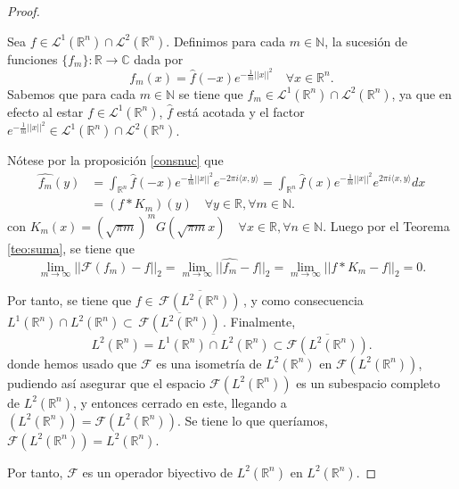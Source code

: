 \begin{proof}
\begin{itemize}
    Sea $f \in \mathscr{L}^1(\mathbb{R}^n) \cap \mathscr{L}^2(\mathbb{R}^n)$. Definimos para cada $m \in \mathbb{N}$, la sucesión de funciones $\{f_m\} : \mathbb{R} \rightarrow \mathbb{C}$ dada por
    \begin{equation}
        f_m(x) = \widehat{f}(-x)e^{-\frac{1}{m}||x||^2} \quad \forall x \in \mathbb{R}^n.
    \end{equation}
    Sabemos que para cada $m \in \mathbb{N}$ se tiene que $f_m \in \mathscr{L}^1(\mathbb{R}^n) \cap \mathscr{L}^2(\mathbb{R}^n)$, ya que en efecto al estar $f\in \mathscr{L}^1(\mathbb{R}^n)$, $\widehat{f}$ está acotada y el factor $e^{-\frac{1}{m}||x||^2} \in \mathscr{L}^1(\mathbb{R}^n) \cap \mathscr{L}^2(\mathbb{R}^n) $. 

    Nótese por la proposición \ref{consnuc} que
    \begin{equation}
    \begin{aligned}
        \widehat{f_m}(y) &= \int_{\mathbb{R}^n} \widehat{f}(-x)e^{-\frac{1}{m}||x||^2}e^{-2 \pi i \langle x,y \rangle} 
        = \int_{\mathbb{R}^n} \widehat{f}(x)e^{-\frac{1}{m}||x||^2}e^{2 \pi i \langle x,y \rangle} dx \\
        &= (f*K_m)(y) \quad \forall y \in \mathbb{R}, \forall m \in \mathbb{N}.
    \end{aligned}
    \end{equation}
    con $K_m(x) = (\sqrt{\pi m})^{m}G(\sqrt{\pi m }x) \quad \forall x \in \mathbb{R}, \forall n \in \mathbb{N}$.
    Luego  por el Teorema \ref{teo:suma}, se tiene que 
    \begin{equation}
       \lim_{m \rightarrow \infty} ||\mathscr{F}(f_m)-f||_2 =  \lim_{m \rightarrow \infty} ||\widehat{f_m}-f||_2 = \lim_{m \rightarrow \infty} ||f*K_m-f||_2 = 0.
    \end{equation}

    Por tanto, se tiene que $f \in \overline{\, \mathscr{F}(L^2(\mathbb{R}^n))\,}$, y como consecuencia  $L^1(\mathbb{R}^n) \cap L^2(\mathbb{R}^n) \subset \overline{\, \mathscr{F}(L^2(\mathbb{R}^n))\,}$. 
    Finalmente,
    \begin{equation}
    L^2(\mathbb{R}^n) = \overline{L^1(\mathbb{R}^n) \cap L^2(\mathbb{R}^n)} \subset \overline{\mathscr{F}(L^2(\mathbb{R}^n))}.
    \end{equation}
    donde hemos usado que $\mathscr{F}$ es una isometría de $L^2(\mathbb{R}^n)$ en $\mathscr{F}(L^2(\mathbb{R}^n))$, pudiendo así asegurar que el espacio $\mathscr{F}(L^2(\mathbb{R}^n))$ es un subespacio completo de $L^2(\mathbb{R}^n)$, y entonces cerrado en este, llegando a $(L^2(\mathbb{R}^n)) = \mathscr{F}(L^2(\mathbb{R}^n))$.
    Se tiene lo que queríamos, $\mathscr{F}(L^2(\mathbb{R}^n)) = L^2(\mathbb{R}^n)$.

    

    
\end{itemize}

Por tanto, $\mathscr{F}$ es un operador biyectivo de $L^2(\mathbb{R}^n)$ en $L^2(\mathbb{R}^n)$.
\end{proof}

